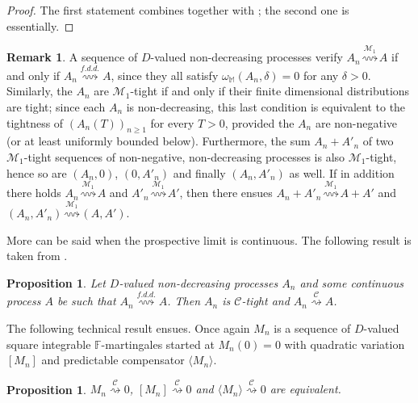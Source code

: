 \documentclass[final]{amsart}
\newtheorem{prop}[thm]{Proposition}
\theoremstyle{definition}
\newtheorem{rem}{Remark}[section]
\numberwithin{equation}{section}
\def\crochet#1{\langle #1 \rangle}
\newcommand{\dM}{\ensuremath{\mathbb{M}}}
\begin{document}
\begin{proof}
The first statement combines \citet[Corollary 13.6.1]{Whitt:2002} together with \citet[Lemma 13.6.5]{Whitt:2002};
the second one is \citet[Theorem 13.6.3]{Whitt:2002} essentially.
\end{proof}

\begin{rem}\label{rem:M1increasing} A sequence of $D$-valued non-decreasing processes verify
$A_n \stackrel{\mathcal{M}_1}{\rightsquigarrow} A$
if and only if $A_n \stackrel{f.d.d.}{\rightsquigarrow} A$, since they all satisfy $\omega_\dM(A_n,\delta)=0$ for any $\delta>0$.
Similarly, the $A_n$ are $\mathcal{M}_1$-tight if and only if their finite dimensional distributions are tight; since each $A_n$ is
non-decreasing, this last condition is equivalent to the tightness of $(A_n(T))_{n\ge 1}$ for every $T>0$, provided the $A_n$ are
non-negative (or at least uniformly bounded below). Furthermore, the
sum $A_n+A'_n$ of two $\mathcal{M}_1$-tight sequences of non-negative, non-decreasing processes is also $\mathcal{M}_1$-tight,
hence so are $(A_n,0)$, $(0,A'_n)$ and finally $(A_n,A'_n)$ as well. If in addition there holds
$A_n \stackrel{\mathcal{M}_1}{\rightsquigarrow} A$ and $A'_n \stackrel{\mathcal{M}_1}{\rightsquigarrow} A'$, then
there ensues $A_n+A'_n \stackrel{\mathcal{M}_1}{\rightsquigarrow} A+A'$ and
$(A_n,A'_n) \stackrel{\mathcal{M}_1}{\rightsquigarrow} (A,A')$.
\end{rem}

More can be said when the prospective limit is continuous. The following result is taken from \citet[Proposition A.4]{Remillard/Vaillancourt:2024a}.

\begin{prop}\label{prop:Cincreasing}
Let $D$-valued non-decreasing processes $A_n$ and some continuous process $A$
be such that $A_n \stackrel{f.d.d.}{\rightsquigarrow} A$. Then $A_n$ is $\mathcal{C}$-tight
and $A_n \stackrel{\mathcal{C}}{\rightsquigarrow} A$.
\end{prop}

The following technical result ensues. Once again $M_n$ is a sequence of $D$-valued square integrable
$\mathbb{F}$-martingales started at $M_n(0)=0$
with quadratic variation $[M_n]$ and predictable compensator $\crochet{ M_n }$.

\begin{prop}\label{prop:Cto0}
$M_n \stackrel{\mathcal{C}}{\rightsquigarrow} 0$,
$[M_n] \stackrel{\mathcal{C}}{\rightsquigarrow} 0$ and
$\crochet{ M_n }  \stackrel{\mathcal{C}}{\rightsquigarrow} 0$ are equivalent.
\end{prop}
\end{document}
